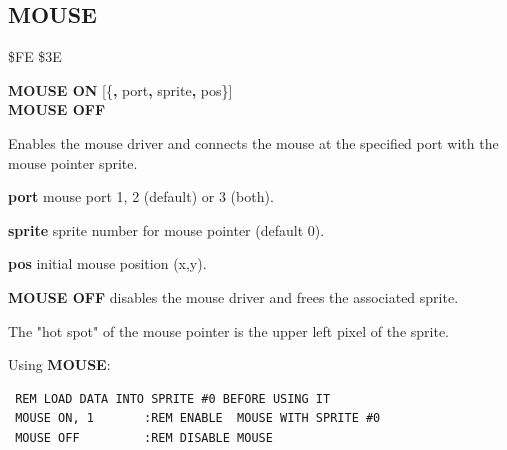 \subsection{MOUSE}
\begin{description}[leftmargin=2cm,style=nextline]
\item [Token:] \$FE \$3E
\item [Format:] {\bf MOUSE ON} [\{{\bf,} port{\bf,} sprite{\bf,} pos\}] \\
                {\bf MOUSE OFF}
\item [Usage:]  Enables the mouse driver
                and connects the mouse at the specified port
                with the mouse pointer sprite.

                {\bf port} mouse port 1, 2 (default) or 3 (both).

                {\bf sprite} sprite number for mouse pointer (default 0).

                {\bf pos} initial mouse position (x,y).

                {\bf MOUSE OFF} disables the mouse
                driver and frees the associated sprite.

\item [Remarks:] The "hot spot" of the mouse pointer is the upper left
                pixel of the sprite.

\item [Examples:] Using {\bf MOUSE}:
\begin{tcolorbox}[colback=black,coltext=white]
\verbatimfont{\codefont}
\begin{verbatim}
 REM LOAD DATA INTO SPRITE #0 BEFORE USING IT
 MOUSE ON, 1       :REM ENABLE  MOUSE WITH SPRITE #0
 MOUSE OFF         :REM DISABLE MOUSE
\end{verbatim}
\end{tcolorbox}
\end{description}


\newpage
